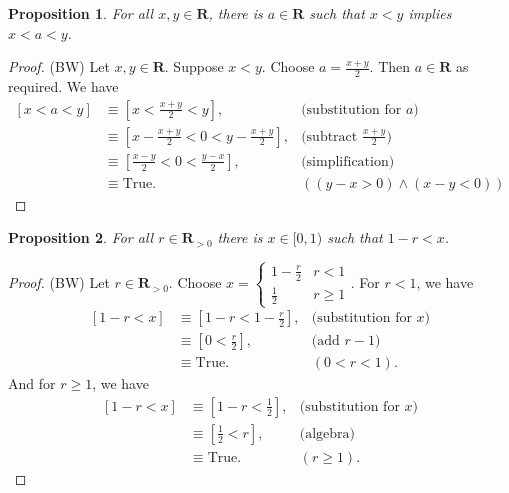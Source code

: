 \documentclass[12pt,fleqn]{article}
\newcommand{\reals}{\mathbf{R}}
\newcommand{\true}{\mathrm{True}}
\newenvironment{myproof}
  {\begin{shaded}\begin{proof}}
  {\end{proof}\end{shaded}}
\newtheorem{prop}{Proposition}
\begin{document}
\begin{prop}
  For all $x,y \in \reals$, there is $a \in \reals$ such that
    $x < y$ implies $x<a<y$.    \label{x1}
\end{prop} 
\begin{myproof} (BW)
    Let $x,y \in \reals$. Suppose $x < y$. Choose $a = \frac{x+y}{2}$.
    Then $a \in \reals$ as required. We have
    \begin{align*}
      \left[ x < a < y \right] 
          &\equiv \left[ x < \frac{x+y}{2} < y \right], &\mbox{(substitution for $a$)} \\
          & \equiv \left[ x - \frac{x+y}{2} < 0 < y - \frac{x+y}{2}  \right], &\mbox{(subtract $\frac{x+y}{2}$)} \\
          & \equiv \left[ \frac{x-y}{2} < 0 < \frac{y-x}{2}  \right], &\mbox{(simplification)} \\
          & \equiv \true. &((y-x > 0) \land (x-y < 0))
    \end{align*} 
\end{myproof}


     \begin{prop} 
     For all $r \in \reals_{>0}$ there is $x \in [0,1)$ such that $1-r < x$. 
     \end{prop}

    
     
      \begin{myproof} (BW) Let $r \in \reals_{>0}$. Choose $x = \begin{cases} 1 - \frac{r}{2}  & r < 1 \\ \frac{1}{2} & r \geq 1 \end{cases}$. For $r < 1$, we have
      \begin{align*}
       \left[1-r < x \right] &\equiv \left[1-r < 1 - \frac{r}{2}  \right], & \mbox{(substitution for $x$)} \\
                                  &\equiv  \left[0 <  \frac{r}{2}  \right], & \mbox{(add $r-1$)} \\
                                  &\equiv \true.   &(0 < r < 1).
      \end{align*}
      And for $r \geq 1$, we have
       \begin{align*}
       \left[1-r < x \right] &\equiv \left[1-r < \frac{1}{2}  \right], & \mbox{(substitution for $x$)} \\
                                  &\equiv  \left[\frac{1}{2}  <  r  \right], & \mbox{(algebra)} \\
                                  &\equiv \true.   &(r \geq 1).
      \end{align*}
      \end{myproof}
     
\end{document}

